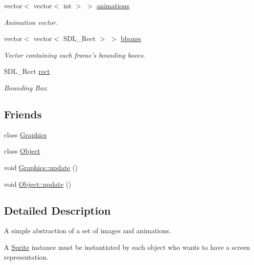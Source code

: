 \begin{DoxyCompactItemize}
vector$<$ vector$<$ int $>$ $>$ \hyperlink{class_sprite_a53b4aa1ae4e205df76c5145934fd7c8f}{animations}
\begin{DoxyCompactList}\small\item\em Animation vector. \end{DoxyCompactList}\item 
vector$<$ vector$<$ S\-D\-L\-\_\-\-Rect $>$ $>$ \hyperlink{class_sprite_ad18e21f70d9bc3d1e52d2d4c25645e15}{bboxes}
\begin{DoxyCompactList}\small\item\em Vector containing each frame's bounding boxes. \end{DoxyCompactList}\item 
S\-D\-L\-\_\-\-Rect \hyperlink{class_sprite_ab8ae1fcc8b8fb328583438cf1f0b6e2f}{rect}
\begin{DoxyCompactList}\small\item\em Bounding Box. \end{DoxyCompactList}\end{DoxyCompactItemize}
\subsection*{Friends}
\begin{DoxyCompactItemize}
\item 
class \hyperlink{class_sprite_ae5cfe0c0e0b06d536d5814bd1ff4818f}{Graphics}
\item 
class \hyperlink{class_sprite_a0720b5f434e636e22a3ed34f847eec57}{Object}
\item 
void \hyperlink{class_sprite_af4cff1e3ae7e299888e9790c6252dc10}{Graphics\-::update} ()
\item 
void \hyperlink{class_sprite_a9338a05480ae44ecf5fa4f5fcf713bbb}{Object\-::update} ()
\end{DoxyCompactItemize}


\subsection{Detailed Description}
A simple abstraction of a set of images and animations. 

A \hyperlink{class_sprite}{Sprite} instance must be instantiated by each object who wants to have a screen representation. 

